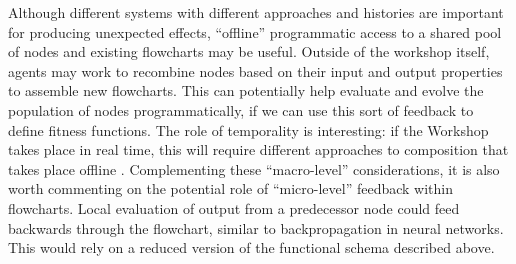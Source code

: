 Although different systems with different approaches and histories are
important for producing unexpected effects, ``offline'' programmatic
access to a shared pool of nodes and existing flowcharts may be
useful.  Outside of the workshop itself, agents may work to recombine
nodes based on their input and output properties to assemble new
flowcharts.  This can potentially help evaluate and evolve the
population of nodes programmatically, if we can use this sort of
feedback to define fitness functions.  The role of
temporality is interesting: if the Workshop takes place in real time,
this will require different approaches to composition that takes place
offline \cite{perez2013rolling}.
%
Complementing these ``macro-level'' considerations, it is also worth
commenting on the potential role of ``micro-level'' feedback within
flowcharts.  Local evaluation of output from a predecessor node could
feed backwards through the flowchart, similar to backpropagation in
neural networks.  This would rely on a reduced version of the
functional schema described above.
